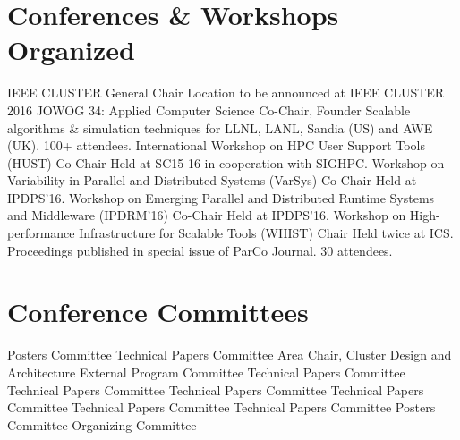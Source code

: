 \section{Conferences \& Workshops Organized}
        {IEEE CLUSTER}
        {General Chair}
        {}{}
        {Location to be announced at IEEE CLUSTER 2016}
		{JOWOG 34: Applied Computer Science}
		{Co-Chair, Founder}
		{}{}
		{Scalable algorithms \& simulation techniques for
		 LLNL, LANL, Sandia (US) and AWE (UK).  100+ attendees.}
		{International Workshop on HPC User Support Tools (HUST)}
		{Co-Chair}{}{}
		{Held at SC15-16 in cooperation with SIGHPC.}
		{Workshop on Variability in Parallel and Distributed Systems (VarSys)}
		{Co-Chair}{}{}
		{Held at IPDPS'16.}
        {Workshop on Emerging Parallel and Distributed Runtime Systems and Middleware\newline
         (IPDRM'16)}
		{Co-Chair}{}{}
		{Held at IPDPS'16.}
		{Workshop on High-performance Infrastructure for Scalable Tools (WHIST)}
		{Chair}{}{}
		{Held twice at ICS. Proceedings published in special issue of ParCo Journal. 30 attendees.}


    \section{Conference Committees}
		{Posters Committee}{}{}{}
        {Technical Papers Committee}{}{}{}
		{Area Chair, Cluster Design and Architecture}{}{}{}
		{External Program Committee}{}{}{}
		{Technical Papers Committee}{}{}{}
		{Technical Papers Committee}{}{}{}
		{Technical Papers Committee}{}{}{}
		{Technical Papers Committee}{}{}{}
		{Technical Papers Committee}{}{}{}
		{Technical Papers Committee}{}{}{}
		{Posters Committee}{}{}{}
        {Organizing Committee}{}{}{}

